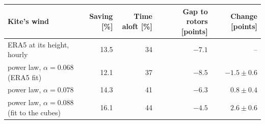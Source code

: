 \begin{tabular}{@{}lrrrr@{}}
\toprule
Kite's wind & Saving [\%] & Time aloft [\%] & Gap to rotors [points] & Change [points] \\
\midrule
ERA5 at its height, hourly & 13.5 & 34 & \(-7.1\) & -- \\
power law, \(\alpha = 0.068\) (ERA5 fit) & 12.1 & 37 & \(-8.5\) & \(-1.5 \pm 0.6\) \\
power law, \(\alpha = 0.078\) & 14.3 & 41 & \(-6.3\) & \(0.8 \pm 0.4\) \\
power law, \(\alpha = 0.088\) (fit to the cubes) & 16.1 & 44 & \(-4.5\) & \(2.6 \pm 0.6\) \\
\bottomrule
\end{tabular}
